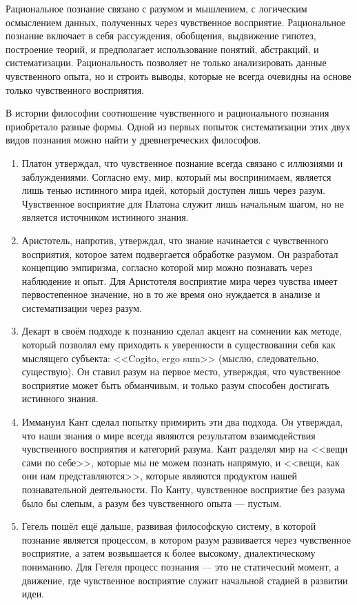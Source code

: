 \documentclass[12pt,a4paper]{article}
\begin{document}
	Рациональное познание связано с разумом и мышлением, с логическим осмыслением данных, полученных через чувственное восприятие. Рациональное познание включает в себя рассуждения, обобщения, выдвижение гипотез, построение теорий, и предполагает использование понятий, абстракций, и систематизации. Рациональность позволяет не только анализировать данные чувственного опыта, но и строить выводы, которые не всегда очевидны на основе только чувственного восприятия.
	
	В истории философии соотношение чувственного и рационального познания приобретало разные формы. Одной из первых попыток систематизации этих двух видов познания можно найти у древнегреческих философов.
	
	\begin{enumerate}
		\item Платон утверждал, что чувственное познание всегда связано с иллюзиями и заблуждениями. Согласно ему, мир, который мы воспринимаем, является лишь тенью истинного мира идей, который доступен лишь через разум. Чувственное восприятие для Платона служит лишь начальным шагом, но не является источником истинного знания.
		
		\item Аристотель, напротив, утверждал, что знание начинается с чувственного восприятия, которое затем подвергается обработке разумом. Он разработал концепцию эмпиризма, согласно которой мир можно познавать через наблюдение и опыт. Для Аристотеля восприятие мира через чувства имеет первостепенное значение, но в то же время оно нуждается в анализе и систематизации через разум.
		
		\item Декарт в своём подходе к познанию сделал акцент на сомнении как методе, который позволял ему приходить к уверенности в существовании себя как мыслящего субъекта: <<Cogito, ergo sum>> (мыслю, следовательно, существую). Он ставил разум на первое место, утверждая, что чувственное восприятие может быть обманчивым, и только разум способен достигать истинного знания.
		
		\item Иммануил Кант сделал попытку примирить эти два подхода. Он утверждал, что наши знания о мире всегда являются результатом взаимодействия чувственного восприятия и категорий разума. Кант разделял мир на <<вещи сами по себе>>, которые мы не можем познать напрямую, и <<вещи, как они нам представляются>>, которые являются продуктом нашей познавательной деятельности. По Канту, чувственное восприятие без разума было бы слепым, а разум без чувственного опыта — пустым.
		
		\item Гегель пошёл ещё дальше, развивая философскую систему, в которой познание является процессом, в котором разум развивается через чувственное восприятие, а затем возвышается к более высокому, диалектическому пониманию. Для Гегеля процесс познания — это не статический момент, а движение, где чувственное восприятие служит начальной стадией в развитии идеи.
	\end{enumerate}
	
\end{document}
